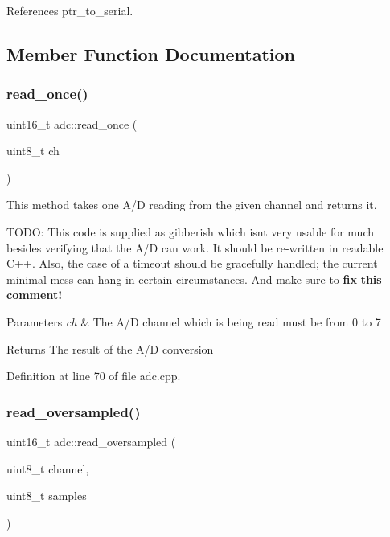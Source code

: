 References ptr\+\_\+to\+\_\+serial.



\subsection{Member Function Documentation}
\mbox{\label{classadc_a2190a59696a7093e1ea605e998ccf97e}} 
\subsubsection{\texorpdfstring{read\+\_\+once()}{read\_once()}}
{\footnotesize\ttfamily uint16\+\_\+t adc\+::read\+\_\+once (\begin{DoxyParamCaption}\item[{uint8\+\_\+t}]{ch }\end{DoxyParamCaption})}



This method takes one A/D reading from the given channel and returns it. 

T\+O\+DO\+: This code is supplied as gibberish which isn\textquotesingle{}t very usable for much besides verifying that the A/D can work. It should be re-\/written in readable C++. Also, the case of a timeout should be gracefully handled; the current minimal mess can hang in certain circumstances. And make sure to {\bfseries fix} {\bfseries this} {\bfseries comment!} 
\begin{DoxyParams}{Parameters}
{\em ch} & The A/D channel which is being read must be from 0 to 7 \\
\hline
\end{DoxyParams}
\begin{DoxyReturn}{Returns}
The result of the A/D conversion 
\end{DoxyReturn}


Definition at line 70 of file adc.\+cpp.

\mbox{\label{classadc_a58f1030fe64d3dea4ccd8a2687dd6fce}} 
\subsubsection{\texorpdfstring{read\+\_\+oversampled()}{read\_oversampled()}}
{\footnotesize\ttfamily uint16\+\_\+t adc\+::read\+\_\+oversampled (\begin{DoxyParamCaption}\item[{uint8\+\_\+t}]{channel,  }\item[{uint8\+\_\+t}]{samples }\end{DoxyParamCaption})}



